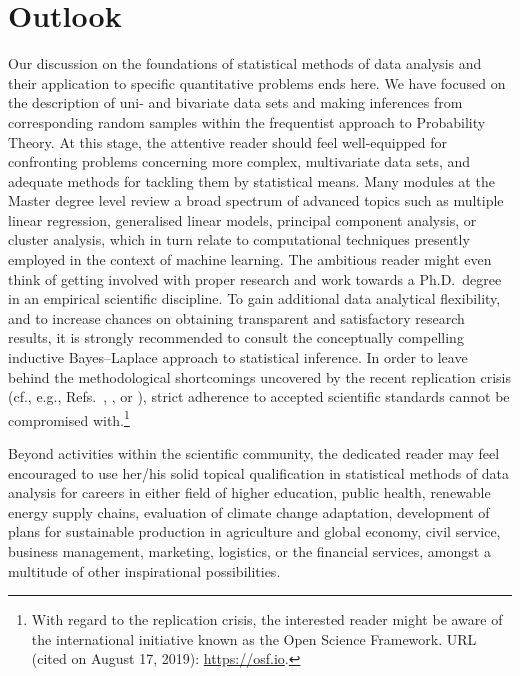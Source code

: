 \chapter*{Outlook}
Our discussion on the foundations of statistical methods of data
analysis and their application to specific quantitative problems
ends here. We have focused on the description of uni- and bivariate
data sets and making inferences from corresponding random samples
within the frequentist approach to Probability Theory. At this
stage, the attentive reader should feel well-equipped for
confronting problems concerning more complex, multivariate data
sets, and adequate methods for tackling them by statistical means.
Many modules at the Master degree level review a broad spectrum of
advanced topics such as multiple linear regression, generalised
linear models, principal component analysis, or cluster analysis,
which in turn relate to computational techniques presently employed
in the context of machine learning. The ambitious reader might even
think of getting involved with proper research and work towards a
Ph.D.~degree in an empirical scientific discipline. To gain
additional data analytical flexibility, and to increase chances on
obtaining transparent and satisfactory research results, it is
strongly recommended to consult the conceptually compelling
inductive Bayes--Laplace approach to statistical inference. In
order to leave behind the methodological shortcomings uncovered by
the recent replication crisis (cf., e.g., Refs.~,
, or ), strict adherence to accepted
scientific standards cannot be compromised with.\footnote{With
regard to the replication crisis, the interested reader might be
aware of the international initiative known as the Open Science
Framework. URL (cited on August 17, 2019):
\href{https://osf.io}{https://osf.io}.}

\medskip
\noindent
Beyond activities within the scientific community, the dedicated
reader may feel encouraged to use her/his solid topical
qualification in statistical methods of data analysis for careers
in either field of higher education, public health, renewable
energy supply chains, evaluation of climate change adaptation,
development of plans for sustainable production in agriculture and
global economy, civil service, business management, marketing,
logistics, or the financial services, amongst a multitude of other
inspirational possibilities.

